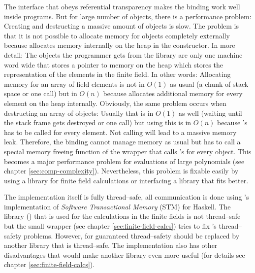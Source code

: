 The interface that obeys referential transparency makes the binding work well
inside \JWThaskell{} programs. But for large number of \JWTntl{} objects, there
is a performance problem: Creating and destructing a massive amount of objects
is slow. The problem is that it is not possible to allocate memory for \JWTntl{}
objects completely externally because \JWTntl{} allocates memory internally on
the heap in the constructor. In more detail: The objects the programmer gets
from the \JWTntl{} library are only one machine word wide that stores a pointer
to memory on the heap which stores the representation of the elements in the
finite field. In other words: Allocating memory for an array of field elements
is not in $O(1)$ as usual (a chunk of stack space or one  call)
but in $O(n)$ because \JWTntl{} allocates additional memory for every element on
the heap internally. Obviously, the same problem occurs when destructing an
array of \JWTntl{} objects: Usually that is in $O(1)$ as well (waiting until the
stack frame gets destroyed or one  call) but using \JWTntl{} this
is in $O(n)$ because \JWTcpp{}'s  has to be called for every
element. Not calling  will lead to a massive memory leak.
Therefore, the \JWThaskell{} binding cannot manage memory as usual but has to
call a special memory freeing function of the \JWTc{} wrapper that calls
\JWTcpp{}'s  for every object. This becomes a major performance
problem for evaluations of large polynomials (see chapter
\ref{sec:comp-complexity}). Nevertheless, this problem is fixable easily by
using a \JWThaskell{} library for finite field calculations or interfacing a
library that fits better.



The implementation itself is fully thread--safe, all communication is done using
\JWTghc{}'s implementation of \emph{Software Transactional Memory} (STM)
\cite{stm05} for Haskell. The library (\JWTntl{}) that is used for the
calculations in the finite fields is not thread--safe but the small \JWTc{}
wrapper (see chapter \ref{sec:finite-field-calcs}) tries to fix \JWTntl{}'s
thread--safety problems. However, for guaranteed thread--safety \JWTntl{} should
be replaced by another library that is thread--safe. The \JWTntl{}
implementation also has other disadvantages that would make another library even
more useful (for details see chapter \ref{sec:finite-field-calcs}).



